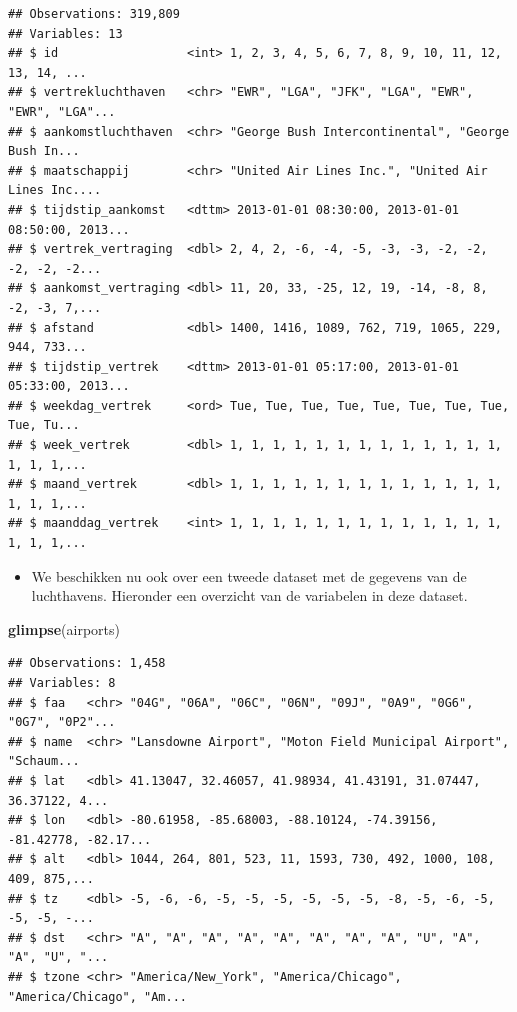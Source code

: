 \documentclass[]{tufte-book}
\newenvironment{Shaded}{}{}
\newcommand{\KeywordTok}[1]{\textcolor[rgb]{0.00,0.44,0.13}{\textbf{#1}}}
\newcommand{\NormalTok}[1]{#1}
\providecommand{\tightlist}{%
  \setlength{\itemsep}{0pt}\setlength{\parskip}{0pt}}
\begin{document}
\begin{verbatim}
## Observations: 319,809
## Variables: 13
## $ id                  <int> 1, 2, 3, 4, 5, 6, 7, 8, 9, 10, 11, 12, 13, 14, ...
## $ vertrekluchthaven   <chr> "EWR", "LGA", "JFK", "LGA", "EWR", "EWR", "LGA"...
## $ aankomstluchthaven  <chr> "George Bush Intercontinental", "George Bush In...
## $ maatschappij        <chr> "United Air Lines Inc.", "United Air Lines Inc....
## $ tijdstip_aankomst   <dttm> 2013-01-01 08:30:00, 2013-01-01 08:50:00, 2013...
## $ vertrek_vertraging  <dbl> 2, 4, 2, -6, -4, -5, -3, -3, -2, -2, -2, -2, -2...
## $ aankomst_vertraging <dbl> 11, 20, 33, -25, 12, 19, -14, -8, 8, -2, -3, 7,...
## $ afstand             <dbl> 1400, 1416, 1089, 762, 719, 1065, 229, 944, 733...
## $ tijdstip_vertrek    <dttm> 2013-01-01 05:17:00, 2013-01-01 05:33:00, 2013...
## $ weekdag_vertrek     <ord> Tue, Tue, Tue, Tue, Tue, Tue, Tue, Tue, Tue, Tu...
## $ week_vertrek        <dbl> 1, 1, 1, 1, 1, 1, 1, 1, 1, 1, 1, 1, 1, 1, 1, 1,...
## $ maand_vertrek       <dbl> 1, 1, 1, 1, 1, 1, 1, 1, 1, 1, 1, 1, 1, 1, 1, 1,...
## $ maanddag_vertrek    <int> 1, 1, 1, 1, 1, 1, 1, 1, 1, 1, 1, 1, 1, 1, 1, 1,...
\end{verbatim}

\begin{itemize}
\tightlist
\item
  We beschikken nu ook over een tweede dataset met de gegevens van de luchthavens. Hieronder een overzicht van de variabelen in deze dataset.
\end{itemize}

\begin{Shaded}
\begin{Highlighting}[]
\KeywordTok{glimpse}\NormalTok{(airports)}
\end{Highlighting}
\end{Shaded}

\begin{verbatim}
## Observations: 1,458
## Variables: 8
## $ faa   <chr> "04G", "06A", "06C", "06N", "09J", "0A9", "0G6", "0G7", "0P2"...
## $ name  <chr> "Lansdowne Airport", "Moton Field Municipal Airport", "Schaum...
## $ lat   <dbl> 41.13047, 32.46057, 41.98934, 41.43191, 31.07447, 36.37122, 4...
## $ lon   <dbl> -80.61958, -85.68003, -88.10124, -74.39156, -81.42778, -82.17...
## $ alt   <dbl> 1044, 264, 801, 523, 11, 1593, 730, 492, 1000, 108, 409, 875,...
## $ tz    <dbl> -5, -6, -6, -5, -5, -5, -5, -5, -5, -8, -5, -6, -5, -5, -5, -...
## $ dst   <chr> "A", "A", "A", "A", "A", "A", "A", "A", "U", "A", "A", "U", "...
## $ tzone <chr> "America/New_York", "America/Chicago", "America/Chicago", "Am...
\end{verbatim}
\end{document}
